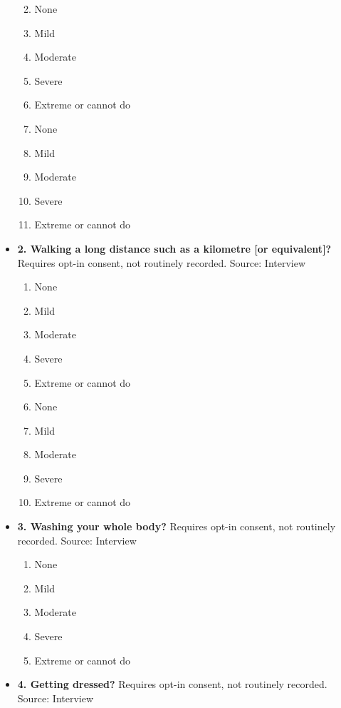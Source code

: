 \documentclass[
]{scrartcl}
\providecommand{\tightlist}{%
  \setlength{\itemsep}{0pt}\setlength{\parskip}{0pt}}\usepackage{longtable,booktabs,array}
\begin{document}
\begin{itemize}
  \begin{enumerate}
  \def\labelenumi{\arabic{enumi}.}
  \tightlist
  \item
    None
  \item
    Mild
  \item
    Moderate
  \item
    Severe
  \item
    Extreme or cannot do
  \item
    None
  \item
    Mild
  \item
    Moderate
  \item
    Severe
  \item
    Extreme or cannot do
  \end{enumerate}
\item
  \textbf{2. Walking a long distance such as a kilometre {[}or
  equivalent{]}?} Requires opt-in consent, not routinely recorded.
  Source: Interview

  \begin{enumerate}
  \def\labelenumi{\arabic{enumi}.}
  \tightlist
  \item
    None
  \item
    Mild
  \item
    Moderate
  \item
    Severe
  \item
    Extreme or cannot do
  \item
    None
  \item
    Mild
  \item
    Moderate
  \item
    Severe
  \item
    Extreme or cannot do
  \end{enumerate}
\item
  \textbf{3. Washing your whole body?} Requires opt-in consent, not
  routinely recorded. Source: Interview

  \begin{enumerate}
  \def\labelenumi{\arabic{enumi}.}
  \tightlist
  \item
    None
  \item
    Mild
  \item
    Moderate
  \item
    Severe
  \item
    Extreme or cannot do
  \end{enumerate}
\item
  \textbf{4. Getting dressed?} Requires opt-in consent, not routinely
  recorded. Source: Interview


\end{itemize}
\end{document}
